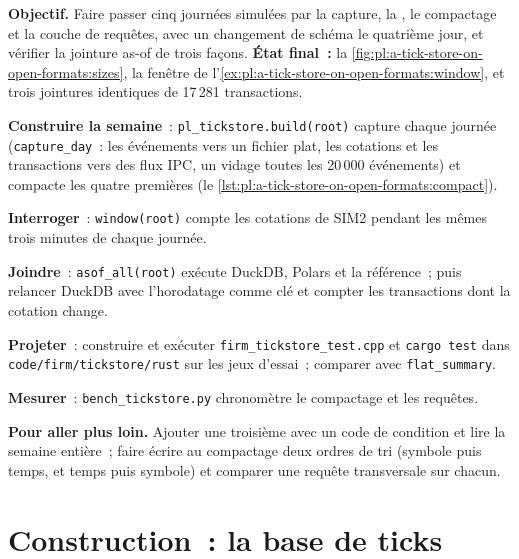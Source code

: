 \begin{tutorial}
\textbf{Objectif.} Faire passer cinq journées simulées par la capture, la , le compactage et la couche de requêtes, avec un changement
de schéma le quatrième jour, et vérifier la jointure as-of de trois façons. \textbf{État final~:} la \cref{fig:pl:a-tick-store-on-open-formats:sizes},
la fenêtre de l'\cref{ex:pl:a-tick-store-on-open-formats:window}, et trois jointures identiques de 17\,281 transactions.
\begin{tutsteps}
\item \textbf{Construire la semaine}~: \texttt{pl\_tickstore.build(root)} capture chaque journée (\texttt{capture\_day}~: les événements vers un
fichier plat, les cotations et les transactions vers des flux IPC, un vidage toutes les 20\,000 événements) et compacte les quatre premières
(le \cref{lst:pl:a-tick-store-on-open-formats:compact}).
\item \textbf{Interroger}~: \texttt{window(root)} compte les cotations de SIM2 pendant les mêmes trois minutes de chaque journée.
\item \textbf{Joindre}~: \texttt{asof\_all(root)} exécute DuckDB, Polars et la référence~; puis relancer DuckDB avec l'horodatage comme clé
et compter les transactions dont la cotation change.
\item \textbf{Projeter}~: construire et exécuter \texttt{firm\_tickstore\_test.cpp} et \texttt{cargo test} dans \texttt{code/firm/tickstore/rust}
sur les jeux d'essai~; comparer avec \texttt{flat\_summary}.
\item \textbf{Mesurer}~: \texttt{bench\_tickstore.py} chronomètre le compactage et les requêtes.
\end{tutsteps}
\textbf{Pour aller plus loin.} Ajouter une troisième  avec un code de condition et lire la semaine entière~; faire écrire au compactage
deux ordres de tri (symbole puis temps, et temps puis symbole) et comparer une requête transversale sur chacun.
\end{tutorial}

\section{Construction~: la base de ticks}\label{bld:pl:a-tick-store-on-open-formats:tickstore}

